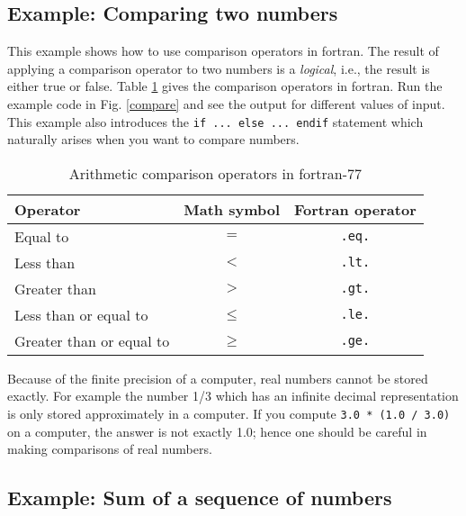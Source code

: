 \documentclass[11pt,oneside]{amsart}
\begin{document}
\subsection{Example: Comparing two numbers}

This example shows how to use comparison operators in fortran. The result of applying a comparison operator to two numbers is a {\em logical}, i.e., the result is either true or false. Table \ref{tab:comp} gives the comparison operators in fortran. Run the example code in Fig. \ref{compare} and see the output for different values of input. This example also introduces the {\tt if ... else ... endif} statement which naturally arises when you want to compare numbers.

\begin{table}
\begin{center}
\begin{tabular}{|l|c|c|}
\hline
Operator & Math symbol & Fortran operator \\
\hline\hline
Equal to  & $=$ & {\tt .eq.} \\
\hline
Less than & $<$ & {\tt .lt.} \\
\hline
Greater than & $>$ & {\tt .gt.} \\
\hline 
Less than or equal to & $\le$ & {\tt .le.} \\
\hline
Greater than or equal to & $\ge$ & {\tt .ge.} \\
\hline
\end{tabular}
\caption{Arithmetic comparison operators in fortran-77}
\label{tab:comp}
\end{center}
\end{table}

Because of the finite precision of a computer, real numbers cannot be stored exactly. For example the number 1/3 which has an infinite decimal representation is only stored approximately in a computer. If you compute {\tt 3.0 * (1.0 / 3.0)} on a computer, the answer is not exactly 1.0; hence one should be careful in making comparisons of real numbers.

\subsection{Example: Sum of a sequence of numbers}
\end{document}
